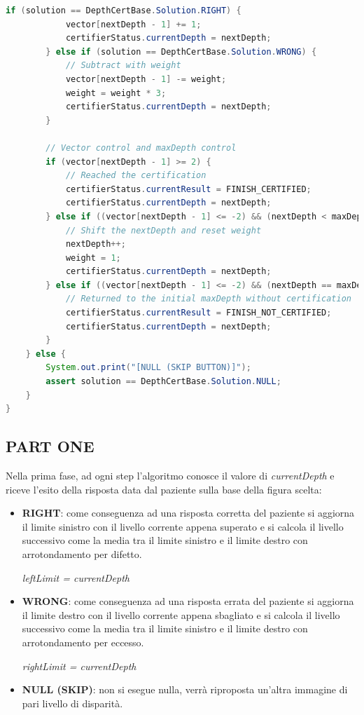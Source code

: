 \documentclass[
	corpo=12pt,
	twoside,
 	evenboxes,
	tipotesi=triennale,
    	stile=classica,
   	 greek,
]{toptesi}
\begin{document}
\begin{lstlisting}[language=Java, label=lst:computenextdepth, caption={Metodo computeNextDepth}]
		if (solution == DepthCertBase.Solution.RIGHT) {
			vector[nextDepth - 1] += 1;
			certifierStatus.currentDepth = nextDepth;
		} else if (solution == DepthCertBase.Solution.WRONG) {
			// Subtract with weight
			vector[nextDepth - 1] -= weight;
			weight = weight * 3;
			certifierStatus.currentDepth = nextDepth;
		}

		// Vector control and maxDepth control
		if (vector[nextDepth - 1] >= 2) {
			// Reached the certification
			certifierStatus.currentResult = FINISH_CERTIFIED;
			certifierStatus.currentDepth = nextDepth;
		} else if ((vector[nextDepth - 1] <= -2) && (nextDepth < maxDepth)) {
			// Shift the nextDepth and reset weight
			nextDepth++;
			weight = 1;
			certifierStatus.currentDepth = nextDepth;
		} else if ((vector[nextDepth - 1] <= -2) && (nextDepth == maxDepth)) {
			// Returned to the initial maxDepth without certification
			certifierStatus.currentResult = FINISH_NOT_CERTIFIED;
			certifierStatus.currentDepth = nextDepth;
		}
	} else {
		System.out.print("[NULL (SKIP BUTTON)]");
		assert solution == DepthCertBase.Solution.NULL;
	}
}
\end{lstlisting}

\subsection{PART ONE}
\label{subsec:part one}

Nella prima fase, ad ogni step l'algoritmo conosce il valore di \textit{currentDepth} e riceve l'esito della risposta data dal paziente sulla base della figura scelta:

\begin{itemize}
\item \textbf{RIGHT}: come conseguenza ad una risposta corretta del paziente si aggiorna il limite sinistro con il livello corrente appena superato e si calcola il livello successivo come la media tra il limite sinistro e il limite destro con arrotondamento per difetto.

\textit{leftLimit = currentDepth}
\item \textbf{WRONG}: come conseguenza ad una risposta errata del paziente si aggiorna il limite destro con il livello corrente appena sbagliato e si calcola il livello successivo come la media tra il limite sinistro e il limite destro con arrotondamento per eccesso.

\textit{rightLimit = currentDepth}

\item \textbf{NULL (SKIP)}: non si esegue nulla, verrà riproposta un'altra immagine di pari livello di disparità.
\end{itemize}
\end{document}
